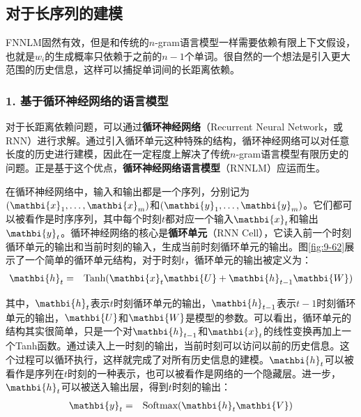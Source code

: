 \subsection{对于长序列的建模}

\parinterval  FNNLM固然有效，但是和传统的$n$-gram语言模型一样需要依赖有限上下文假设，也就是$ w_i $的生成概率只依赖于之前的$ n-1 $个单词。很自然的一个想法是引入更大范围的历史信息，这样可以捕捉单词间的长距离依赖。


\subsubsection{1. 基于循环神经网络的语言模型}

\parinterval  对于长距离依赖问题，可以通过{\small\sffamily\bfseries{循环神经网络}}（Recurrent Neural Network，或RNN）进行求解。通过引入循环单元这种特殊的结构，循环神经网络可以对任意长度的历史进行建模，因此在一定程度上解决了传统$n$-gram语言模型有限历史的问题。正是基于这个优点，{\small\sffamily\bfseries{循环神经网络语言模型}}（RNNLM）应运而生。

\parinterval  在循环神经网络中，输入和输出都是一个序列，分别记为$ ({\mathbi{x}}_1,\dots,{\mathbi{x}}_m) $和$ ({\mathbi{y}}_1,\dots,\\ {\mathbi{y}}_m) $。它们都可以被看作是时序序列，其中每个时刻$ t $都对应一个输入$ {\mathbi{x}}_t $和输出$ {\mathbi{y}}_t $。循环神经网络的核心是{\small\sffamily\bfseries{循环单元}}（RNN Cell），它读入前一个时刻循环单元的输出和当前时刻的输入，生成当前时刻循环单元的输出。图\ref{fig:9-62}展示了一个简单的循环单元结构，对于时刻$ t $，循环单元的输出被定义为：
\begin{eqnarray}
{\mathbi{h}}_t&=&{\textrm{Tanh}}({\mathbi{x}}_t{\mathbi{U}}+{\mathbi{h}}_{t-1}{\mathbi{W}})
\label{eq:9-63}
\end{eqnarray}

\noindent  其中，$ {\mathbi{h}}_t $表示$ t $时刻循环单元的输出，$ {\mathbi{h}}_{t-1} $表示$ t-1 $时刻循环单元的输出，${\mathbi{U}}$和${\mathbi{W}}$是模型的参数。可以看出，循环单元的结构其实很简单，只是一个对$ {\mathbi{h}}_{t-1} $和$ {\mathbi{x}}_t $的线性变换再加上一个Tanh函数。通过读入上一时刻的输出，当前时刻可以访问以前的历史信息。这个过程可以循环执行，这样就完成了对所有历史信息的建模。$ {\mathbi{h}}_t $可以被看作是序列在$ t $时刻的一种表示，也可以被看作是网络的一个隐藏层。进一步，$ {\mathbi{h}}_t $可以被送入输出层，得到$ t $时刻的输出：
\begin{eqnarray}
{\mathbi{y}}_t&=&{\textrm{Softmax}}({\mathbi{h}}_t{\mathbi{V}})
\label{eq:9-64}
\end{eqnarray}

